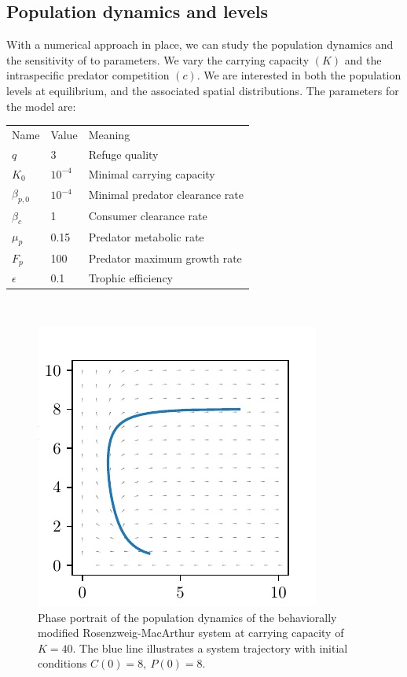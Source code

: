 \subsection{Population dynamics and levels}
With a numerical approach in place, we can study the population dynamics and the sensitivity of  to parameters. We vary the carrying capacity $(K)$ and the intraspecific predator competition $(c)$. We are interested in both  the population levels at equilibrium, and the associated spatial distributions.
The parameters for the model are: \\
\begin{tabular}{l l l}
  Name & Value & Meaning \\
  $q$ & 3 & Refuge quality \\
  $K_0$ & $10^{-4}$ & Minimal carrying capacity \\
  $\beta_{p,0}$ & $10^{-4}$ & Minimal predator clearance rate \\
  $\beta_c$ & 1 & Consumer clearance rate \\
  $\mu_p$ & 0.15 & Predator metabolic rate \\
  $F_p$ & 100 & Predator maximum growth rate \\
  $\epsilon$ & 0.1 & Trophic efficiency
\end{tabular}
\\
\begin{figure}[H]
  \caption{Phase portrait of the population dynamics of the behaviorally modified Rosenzweig-MacArthur system at carrying capacity of $K=40$. The blue line illustrates a system trajectory with initial conditions $C(0)=8,~P(0)=8$.}
  \label{fig:dynamics}
  \includegraphics{plots/dynamics.pdf}
\end{figure}
